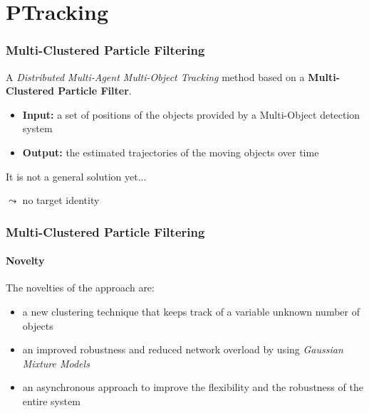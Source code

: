 \section{PTracking}

\begin{frame}
	\frametitle{Multi-Clustered Particle Filtering}
	
	\vspace{0.4cm}
	
	A \emph{Distributed Multi-Agent Multi-Object Tracking} method based on a \textbf{Multi-Clustered Particle
	Filter}.
	
	\vspace{0.3cm}
	
	\begin{itemize}
		\item \textbf{Input:} a set of positions of the objects provided by a Multi-Object detection system
		
		\vspace{0.4cm}
		
		\item \textbf{Output:} the estimated trajectories of the moving objects over time
	\end{itemize}
	
	\vspace{0.3cm}
	
	It is not a general solution yet...
	\vspace{-0.3cm}
	\begin{tabbing}
		\hspace*{0.3cm}
		$ \leadsto $ no target identity
	\end{tabbing}
\end{frame}

\begin{frame}
	\frametitle{Multi-Clustered Particle Filtering}
	\framesubtitle{Novelty}
	
	The novelties of the approach are:
	
	\vspace{0.3cm}
	
	\begin{itemize}
		\item a new clustering technique that keeps track of a variable unknown number of objects
		\vspace{0.2cm}
		\item an improved robustness and reduced network overload by using \emph{Gaussian Mixture Models}
		\vspace{0.2cm}
		\item an asynchronous approach to improve the flexibility and the robustness of the entire system
	\end{itemize}
\end{frame}


